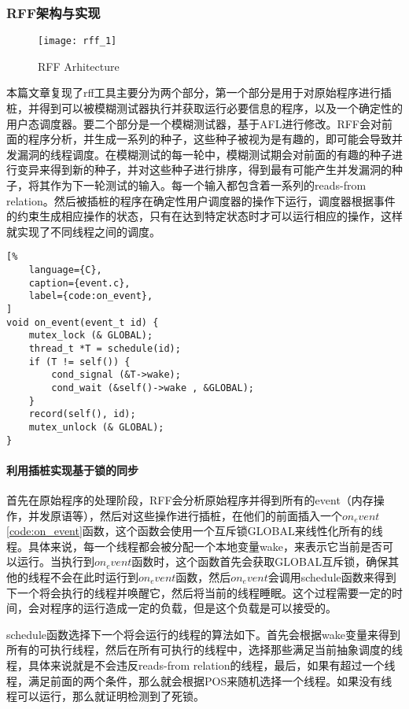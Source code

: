 \subsubsection{RFF架构与实现}

\begin{figure}[ht]
    \centering
    \texttt{[image: rff\_1]}
    \caption{\label{fig:rff}RFF Arhitecture}
\end{figure}

本篇文章复现了rff工具主要分为两个部分，第一个部分是用于对原始程序进行插桩，并得到可以被模糊测试器执行并获取运行必要信息的程序，以及一个确定性的用户态调度器。要二个部分是一个模糊测试器，基于AFL进行修改。RFF会对前面的程序分析，并生成一系列的种子，这些种子被视为是有趣的，即可能会导致并发漏洞的线程调度。在模糊测试的每一轮中，模糊测试期会对前面的有趣的种子进行变异来得到新的种子，并对这些种子进行排序，得到最有可能产生并发漏洞的种子，将其作为下一轮测试的输入。每一个输入都包含着一系列的reads-from relation。然后被插桩的程序在确定性用户调度器的操作下运行，调度器根据事件的约束生成相应操作的状态，只有在达到特定状态时才可以运行相应的操作，这样就实现了不同线程之间的调度。

\begin{spacing}{1.0}
\begin{lstlisting}[%
    language={C},
    caption={event.c},
    label={code:on_event},
]
void on_event(event_t id) {
    mutex_lock (& GLOBAL);
    thread_t *T = schedule(id);
    if (T != self()) {
        cond_signal (&T->wake);
        cond_wait (&self()->wake , &GLOBAL);
    }
    record(self(), id);
    mutex_unlock (& GLOBAL);
}
\end{lstlisting}
\end{spacing}

\paragraph{利用插桩实现基于锁的同步}首先在原始程序的处理阶段，RFF会分析原始程序并得到所有的event（内存操作，并发原语等），然后对这些操作进行插桩，在他们的前面插入一个$on_event$\autoref{code:on_event}函数，这个函数会使用一个互斥锁GLOBAL来线性化所有的线程。具体来说，每一个线程都会被分配一个本地变量wake，来表示它当前是否可以运行。当执行到$on_event$函数时，这个函数首先会获取GLOBAL互斥锁，确保其他的线程不会在此时运行到$on_event$函数，然后$on_event$会调用schedule函数来得到下一个将会执行的线程并唤醒它，然后将当前的线程睡眠。这个过程需要一定的时间，会对程序的运行造成一定的负载，但是这个负载是可以接受的。

schedule函数选择下一个将会运行的线程的算法如下。首先会根据wake变量来得到所有的可执行线程，然后在所有可执行的线程中，选择那些满足当前抽象调度的线程，具体来说就是不会违反reads-from relation的线程，最后，如果有超过一个线程，满足前面的两个条件，那么就会根据POS来随机选择一个线程。如果没有线程可以运行，那么就证明检测到了死锁。

